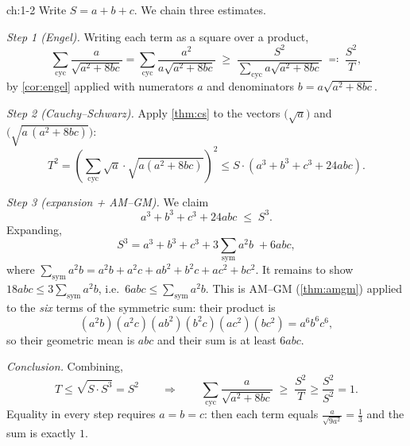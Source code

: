 \begin{solution}{ch:1-2}
Write $S = a+b+c$. We chain three estimates.

\emph{Step 1 (Engel).} Writing each term as a square over a product,
\[
  \sum_{\text{cyc}} \frac{a}{\sqrt{a^2+8bc}}
  = \sum_{\text{cyc}} \frac{a^2}{a\sqrt{a^2+8bc}}
  \;\ge\; \frac{S^2}{\displaystyle\sum_{\text{cyc}} a\sqrt{a^2+8bc}}
  \;\eqqcolon\; \frac{S^2}{T},
\]
by \cref{cor:engel} applied with numerators $a$ and denominators
$b = a\sqrt{a^2+8bc}$.

\emph{Step 2 (Cauchy--Schwarz).} Apply \cref{thm:cs} to the vectors
$\big(\sqrt a\big)$ and $\big(\sqrt{a\,(a^2+8bc)}\big)$:
\[
  T^2
  = \left(\sum_{\text{cyc}} \sqrt{a} \cdot
      \sqrt{a(a^2+8bc)}\right)^{\!2}
  \le S \cdot \left(a^3+b^3+c^3 + 24abc\right).
\]

\emph{Step 3 (expansion + AM--GM).} We claim
\[
  a^3+b^3+c^3+24abc \;\le\; S^3 .
\]
Expanding,
\[
  S^3 = a^3+b^3+c^3
  + 3\!\!\sum_{\text{sym}}\! a^2b \; + 6abc,
\]
where $\sum_{\text{sym}} a^2b = a^2b + a^2c + ab^2 + b^2c + ac^2 +
bc^2$. It remains to show $18abc \le 3\sum_{\text{sym}} a^2b$, i.e.\
$6abc \le \sum_{\text{sym}} a^2b$. This is AM--GM
(\cref{thm:amgm}) applied to the \emph{six} terms of the symmetric
sum: their product is
\[
  (a^2b)(a^2c)(ab^2)(b^2c)(ac^2)(bc^2) = a^6 b^6 c^6,
\]
so their geometric mean is $abc$ and their sum is at least $6abc$.

\emph{Conclusion.} Combining,
\[
  T \le \sqrt{S \cdot S^3} = S^2
  \qquad\Longrightarrow\qquad
  \sum_{\text{cyc}} \frac{a}{\sqrt{a^2+8bc}}
  \;\ge\; \frac{S^2}{T} \ge \frac{S^2}{S^2} = 1 .
\]
Equality in every step requires $a=b=c$: then each term equals
$\tfrac{a}{\sqrt{9a^2}} = \tfrac13$ and the sum is exactly $1$.
\end{solution}
